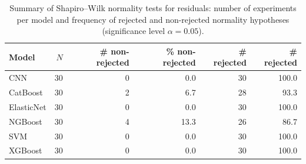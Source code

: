 \begin{table}
\centering
\caption{Summary of Shapiro--Wilk normality tests for residuals: number of experiments per model and frequency of rejected and non-rejected normality hypotheses (significance level $\alpha = 0.05$).}
\label{tab:residual_normality_summary}
\begin{tabular}{lrrrrr}
\toprule
     Model &  $N$ &  \# non-rejected & \% non-rejected &  \# rejected & \# rejected \\
\midrule
       CNN &   30 &                                   0 &                                 0.0 &                       30 &                    100.0 \\
  CatBoost &   30 &                                   2 &                                 6.7 &                       28 &                     93.3 \\
ElasticNet &   30 &                                   0 &                                 0.0 &                       30 &                    100.0 \\
   NGBoost &   30 &                                   4 &                                13.3 &                       26 &                     86.7 \\
       SVM &   30 &                                   0 &                                 0.0 &                       30 &                    100.0 \\
   XGBoost &   30 &                                   0 &                                 0.0 &                       30 &                    100.0 \\
\bottomrule
\end{tabular}
\end{table}
